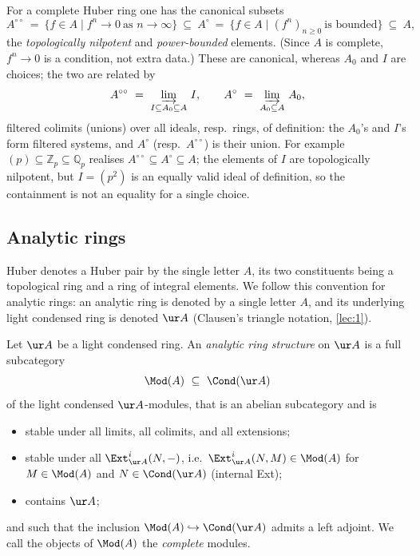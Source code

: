 For a complete Huber ring one has the canonical subsets
\begin{equation}
\label{eq:8:Aoo-Acirc}
A^{\circ\circ}\ =\ \{f\in A\mid f^{n}\to0\ \text{as }n\to\infty\}
\ \subseteq\
A^{\circ}\ =\ \{f\in A\mid (f^{n})_{n\ge0}\ \text{is bounded}\}
\ \subseteq\ A,
\end{equation}
the \emph{topologically nilpotent} and \emph{power-bounded} elements. (Since $A$
is complete, $f^{n}\to0$ is a condition, not extra data.) These are canonical,
whereas $A_{0}$ and $I$ are choices; the two are related by
\begin{equation*}
A^{\circ\circ}\ =\ \varinjlim_{I\subseteq A_{0}\subseteq A}\, I,
\qquad
A^{\circ}\ =\ \varinjlim_{A_{0}\subseteq A}\, A_{0},
\end{equation*}
filtered colimits (unions) over all ideals, resp.\ rings, of definition: the
$A_{0}$'s and $I$'s form filtered systems, and $A^{\circ}$ (resp.\
$A^{\circ\circ}$) is their union. For example $(p)\subseteq\mathbb{Z}_p\subseteq
\mathbb{Q}_p$ realises $A^{\circ\circ}\subseteq A^{\circ}\subseteq A$; the
elements of $I$ are topologically nilpotent, but $I=(p^{2})$ is an equally valid
ideal of definition, so the containment is not an equality for a single choice.

\subsection{Analytic rings}

\begin{notation}
\label{not:8:single-letter}
Huber denotes a Huber pair by the single letter $A$, its two constituents being a
topological ring and a ring of integral elements. We follow this convention for
analytic rings: an analytic ring is denoted by a single letter $A$, and its
underlying light condensed ring is denoted $\ur A$ (Clausen's triangle notation,
\cref{lec:1}).
\end{notation}

\begin{definition}
\label{def:8:analytic-ring}
Let $\ur A$ be a light condensed ring. An \emph{analytic ring structure} on
$\ur A$ is a full subcategory
\begin{equation*}
\Mod(A)\ \subseteq\ \Cond(\ur A)
\end{equation*}
of the light condensed $\ur A$-modules, that is an abelian subcategory and is
\begin{itemize}
\item stable under all limits, all colimits, and all extensions;
\item stable under all $\Ext^{i}_{\ur A}(N,-)$, i.e.\ $\Ext^{i}_{\ur A}(N,M)\in
\Mod(A)$ for $M\in\Mod(A)$ and $N\in\Cond(\ur A)$ (internal Ext);
\item contains $\ur A$;
\end{itemize}
and such that the inclusion $\Mod(A)\hookrightarrow\Cond(\ur A)$ admits a left
adjoint. We call the objects of $\Mod(A)$ the \emph{complete} modules.
\end{definition}

